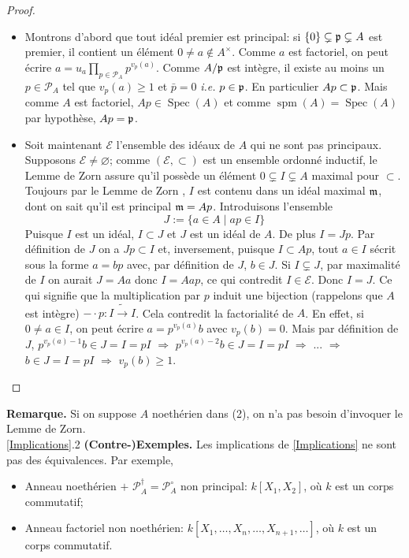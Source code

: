\documentclass[a4paper, oneside, 12pt]{book}
\theoremstyle{theoremeStyle} %
\theoremstyle{definition} %
\newcommand{\ie}{\textit{i.e.}} %
\DeclareMathOperator{\Spec}{Spec}
\DeclareMathOperator{\spm}{spm}
\begin{document}
\begin{proof}
\begin{enumerate}[leftmargin=* ,parsep=0cm,itemsep=0cm,topsep=0cm]
\begin{itemize}[leftmargin=* ,parsep=0cm,itemsep=0cm,topsep=0cm]
\item Montrons d'abord que tout idéal premier est principal: si $\lbrace 0\rbrace\subsetneq \frak{p}\subsetneq A$ est premier, il contient un élément $0\not=a\notin A^\times$. Comme $a$ est factoriel, on peut écrire $a=u_a\prod_{p\in \mathcal{P}_A}p^{v_p(a)}$. Comme $A/\frak{p}$ est intègre, il existe au moins un $p\in \mathcal{P}_A$ tel que $v_p(a)\geq 1$ et  $\bar{p}=0$ \ie{} $p\in \frak{p}$. En particulier $Ap\subset \frak{p}$. Mais comme $A$ est factoriel, $Ap \in \Spec(A)$ et comme $\spm(A)=\Spec(A)$ par hypothèse, $Ap=\frak{p}$.\\
\item Soit maintenant $\mathcal{E}$ l'ensemble des idéaux de $A$ qui ne sont pas principaux. Supposons $\mathcal{E}\not=\varnothing$; comme $(\mathcal{E},\subset)$ est un ensemble ordonné inductif, le Lemme de Zorn assure qu'il possède un élément  $0\subsetneq I\subsetneq A$  maximal pour $\subset$. Toujours par le Lemme de Zorn , $I$  est contenu dans un idéal maximal $\frak{m}$, dont on sait qu'il est principal $\frak{m}=Ap$. Introduisons l'ensemble
$$J:=\lbrace a\in A\;|\; ap\in I\rbrace $$
Puisque $I$ est un idéal, $I\subset J$ et $J $ est un idéal de $A$. De plus $I=Jp$. Par définition de $J$ on a $Jp\subset I$ et, inversement, puisque $I\subset Ap$, tout $a\in I$ sécrit sous la forme $a=bp$ avec, par définition de $J$, $b\in J$. Si $I\subsetneq J$, par maximalité de $I$ on aurait $J=Aa$ donc $I=Aap$, ce qui contredit $I\in\mathcal{E}$. Donc $I=J$. Ce qui signifie que la multiplication par $p$ induit une bijection (rappelons que $A$ est intègre) $-\cdot p:I\tilde{\rightarrow} I$. Cela contredit la factorialité de $A$. En effet, si $0\not=a\in I$, on peut écrire $a=p^{v_p(a)}b$ avec $v_p(b)=0$. Mais   par définition de $J$, $p^{v_p(a)-1}b\in J=I=pI$ $\Rightarrow$ $p^{v_p(a)-2}b\in J=I=pI$ $\Rightarrow$ $...$ $\Rightarrow$ $b\in J=I=pI$ $\Rightarrow$ $v_p(b)\geq 1$.
\end{itemize}
\end{enumerate}
\end{proof}

\textbf{Remarque.} Si on suppose $A$ noethérien dans (2), on n'a pas besoin d'invoquer le Lemme de Zorn.\\

\ref{Implications}.2 \textbf{(Contre-)Exemples.} Les implications de \ref{Implications}  ne sont pas des équivalences. Par exemple,
\begin{itemize}[leftmargin=* ,parsep=0cm,itemsep=0cm,topsep=0cm]
\item Anneau noethérien $+$ $\mathcal{P}_A^\dag=\mathcal{P}_A^\circ$ non principal: $k[X_1,X_2]$, où $k$ est un corps commutatif;
\item Anneau factoriel  non noethérien: $k[X_1,\dots,X_n,\dots, X_{n+1},\dots]$, où $k$ est un corps commutatif.
\end{itemize}
\end{document}
